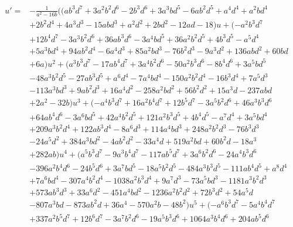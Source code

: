 \documentclass{gtpart}
\theoremstyle{definition}
\theoremstyle{remark}
\begin{document}
\begin{equation*}
\begin{split}
 u' = & -\frac{1}{a^2 - 16 b} \big( (a b^3 d^7 + 3 a^2 b^2 d^6 - 2 b^3 d^6 + 3 a^3 b d^5 - 6 a b^2 d^5 + a^4 d^4 + a^2 b d^4 \\
      & + 2 b^2 d^4 + 4 a^3 d^3 - 15 a b d^3 + a^2 d^2 + 2 b d^2 - 12 a d - 18) u + (-a^2 b^3 d^7 \\
      & + 12 b^4 d^7 - 3 a^3 b^2 d^6 + 36 a b^3 d^6 - 3 a^4 b d^5 + 36 a^2 b^2 d^5 + 4 b^3 d^5 - a^5 d^4 \\
      & + 5 a^3 b d^4 + 94 a b^2 d^4 - 6 a^4 d^3 + 85 a^2 b d^3 - 76 b^2 d^3 - 9 a^3 d^2 + 136 a b d^2 + 60 b d \\
      & + 6 a) u^2 + (a^3 b^3 d^7 - 17 a b^4 d^7 + 3 a^4 b^2 d^6 - 50 a^2 b^3 d^6 - 8 b^4 d^6 + 3 a^5 b d^5 \\
      & - 48 a^3 b^2 d^5 - 27 a b^3 d^5 + a^6 d^4 - 7 a^4 b d^4 - 150 a^2 b^2 d^4 - 16 b^3 d^4 + 7 a^5 d^3 \\
      & - 113 a^3 b d^3 + 9 a b^2 d^3 + 16 a^4 d^2 - 258 a^2 b d^2 + 56 b^2 d^2 + 15 a^3 d - 237 a b d \\
      & + 2 a^2 - 32 b) u^3 + (-a^4 b^3 d^7 + 16 a^2 b^4 d^7 + 12 b^5 d^7 - 3 a^5 b^2 d^6 + 46 a^3 b^3 d^6 \\
      & + 64 a b^4 d^6 - 3 a^6 b d^5 + 42 a^4 b^2 d^5 + 121 a^2 b^3 d^5 + 4 b^4 d^5 - a^7 d^4 + 3 a^5 b d^4 \\
      & + 209 a^3 b^2 d^4 + 122 a b^3 d^4 - 8 a^6 d^3 + 114 a^4 b d^3 + 248 a^2 b^2 d^3 - 76 b^3 d^3 \\
      & - 24 a^5 d^2 + 384 a^3 b d^2 - 4 a b^2 d^2 - 33 a^4 d + 519 a^2 b d + 60 b^2 d - 18 a^3 \\
      & + 282 a b) u^4 + (a^5 b^3 d^7 - 9 a^3 b^4 d^7 - 117 a b^5 d^7 + 3 a^6 b^2 d^6 - 24 a^4 b^3 d^6 \\
      & - 396 a^2 b^4 d^6 - 24 b^5 d^6 + 3 a^7 b d^5 - 18 a^5 b^2 d^5 - 484 a^3 b^3 d^5 - 111 a b^4 d^5 + a^8 d^4 \\
      & + 7 a^6 b d^4 - 307 a^4 b^2 d^4 - 1038 a^2 b^3 d^4 + 9 a^7 d^3 - 73 a^5 b d^3 - 1181 a^3 b^2 d^3 \\
      & + 573 a b^3 d^3 + 33 a^6 d^2 - 451 a^4 b d^2 - 1236 a^2 b^2 d^2 + 72 b^3 d^2 + 54 a^5 d \\
      & - 807 a^3 b d - 873 a b^2 d + 36 a^4 - 570 a^2 b - 48 b^2) u^5 + (-a^6 b^3 d^7 - 5 a^4 b^4 d^7 \\
      & + 337 a^2 b^5 d^7 + 12 b^6 d^7 - 3 a^7 b^2 d^6 - 19 a^5 b^3 d^6 + 1064 a^3 b^4 d^6 + 204 a b^5 d^6 \\

\end{split}
\end{equation*}
\end{document}
